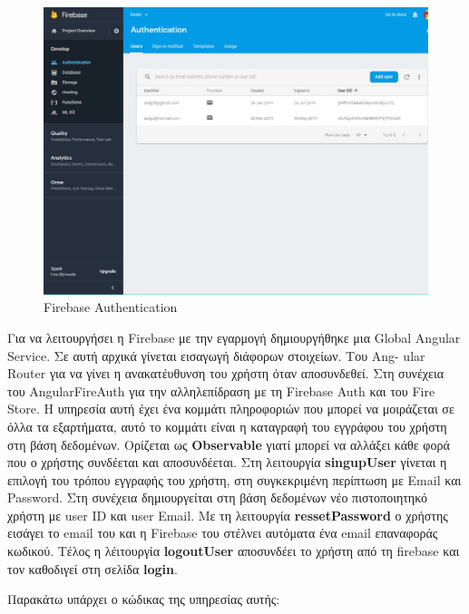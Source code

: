 \documentclass[a4paper,12pt]{article}
\begin{document}
			\begin{figure}[!htb]
				\begin{center}
					\caption{Firebase Authentication}
					\vspace*{0.5cm}

					\includegraphics[width=0.9\linewidth]{firebaseNo1} 
				\end{center}
			\end{figure}

			\newpage
			Για να λειτουργήσει η Firebase με την εγαρμογή δημιουργήθηκε μια Global\newline
			Angular Service. Σε αυτή αρχικά γίνεται εισαγωγή διάφορων στοιχείων.  
			Του Ang-
			ular Router για να γίνει η ανακατέυθυνση
			του χρήστη όταν αποσυνδεθεί. Στη συνέχεια του AngularFireAuth για την αλληλεπίδραση με τη Firebase Auth και του Fire Store. Η υπηρεσία αυτή έχει ένα κομμάτι
			πληροφοριών που μπορεί να μοιράζεται σε όλλα τα εξαρτήματα, αυτό το κομμάτι είναι η καταγραφή του εγγράφου του χρήστη στη βάση δεδομένων. Ορίζεται ως  \textbf{Observable} γιατί
			μπορεί να αλλάξει κάθε φορά που ο χρήστης συνδέεται και αποσυνδέεται. Στη λειτουργία \textbf{singupUser} γίνεται η επιλογή του τρόπου εγγραφής του χρήστη, στη συγκεκριμένη 
			περίπτωση με Email και Password. Στη συνέχεια δημιουργείται στη βάση δεδομένων νέο πιστοποιητηκό χρήστη με user ID και user Email. Με τη λειτουργία 
			\textbf{ressetPassword} ο χρήστης εισάγει το email του και η Firebase του στέλνει αυτόματα ένα email επαναφοράς κωδικού. Τέλος η λέιτουργία \textbf{logoutUser} αποσυνδέει το χρήστη από
			τη firebase και τον καθοδιγεί στη σελίδα \textbf{login}.

			Παρακάτω υπάρχει ο κώδικας της υπηρεσίας αυτής:
\end{document}
